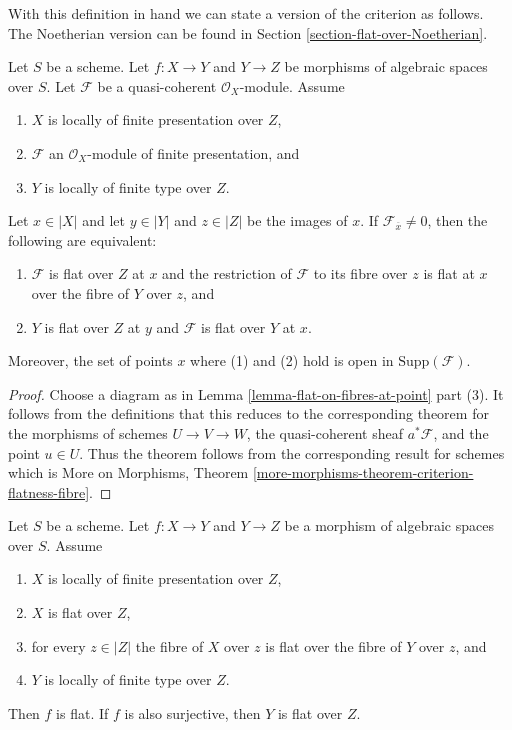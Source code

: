 \noindent
With this definition in hand we can state a version of the criterion as
follows. The Noetherian version can be found in
Section \ref{section-flat-over-Noetherian}.

\begin{theorem}
\label{theorem-criterion-flatness-fibre}
Let $S$ be a scheme.
Let $f : X \to Y$ and $Y \to Z$ be morphisms of algebraic spaces over $S$.
Let $\mathcal{F}$ be a quasi-coherent $\mathcal{O}_X$-module.
Assume
\begin{enumerate}
\item $X$ is locally of finite presentation over $Z$,
\item $\mathcal{F}$ an $\mathcal{O}_X$-module of finite presentation, and
\item $Y$ is locally of finite type over $Z$.
\end{enumerate}
Let $x \in |X|$ and let $y \in |Y|$ and $z \in |Z|$ be the images of
$x$. If $\mathcal{F}_{\overline{x}} \not = 0$, then the following are
equivalent:
\begin{enumerate}
\item $\mathcal{F}$ is flat over $Z$ at $x$ and
the restriction of $\mathcal{F}$ to its fibre over $z$
is flat at $x$ over the fibre of $Y$ over $z$, and
\item $Y$ is flat over $Z$ at $y$ and $\mathcal{F}$ is
flat over $Y$ at $x$.
\end{enumerate}
Moreover, the set of points $x$ where (1) and (2) hold is open in
$\text{Supp}(\mathcal{F})$.
\end{theorem}

\begin{proof}
Choose a diagram as in
Lemma \ref{lemma-flat-on-fibres-at-point} part (3).
It follows from the definitions that this reduces to the
corresponding theorem for the morphisms of schemes
$U \to V \to W$, the quasi-coherent sheaf $a^*\mathcal{F}$,
and the point $u \in U$. Thus the theorem follows from the
corresponding result for schemes which is
More on Morphisms,
Theorem \ref{more-morphisms-theorem-criterion-flatness-fibre}.
\end{proof}

\begin{lemma}
\label{lemma-morphism-between-flat}
Let $S$ be a scheme.
Let $f : X \to Y$ and $Y \to Z$ be a morphism of algebraic spaces over $S$.
Assume
\begin{enumerate}
\item $X$ is locally of finite presentation over $Z$,
\item $X$ is flat over $Z$,
\item for every $z \in |Z|$ the fibre of $X$ over $z$
is flat over the fibre of $Y$ over $z$, and
\item $Y$ is locally of finite type over $Z$.
\end{enumerate}
Then $f$ is flat. If $f$ is also surjective, then $Y$ is flat over $Z$.
\end{lemma}

